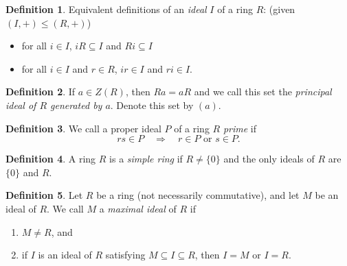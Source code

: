 \documentclass[12pt]{article}
\newcommand{\enumarabic}[1]{
	\begin{enumerate}[label=\textbf{\arabic*.}]
		#1
	\end{enumerate}
}
\theoremstyle{definition}
\newtheorem*{defn}{Definition}
\newcommand{\bulletize}[1]{%
	\begin{itemize}
		#1
	\end{itemize}
}
\begin{document}
\begin{defn}
	Equivalent definitions of an \emph{ideal} $I$ of a ring $R$: (given $(I,+)\leq (R,+)$)
	\bulletize{
		\item for all $i\in I$, $iR\subseteq I$ and $Ri\subseteq I$
		\item for all $i\in I$ and $r\in R$, $ir\in I$ and $ri\in I$.
	}
\end{defn}
\begin{defn}
	If $a\in Z(R)$, then $Ra=aR$ and we call this set the \emph{principal ideal of $R$ generated by $a$}.  Denote this set by $(a)$.
\end{defn}
\begin{defn}
	We call a proper ideal $P$ of a ring $R$ \emph{prime} if 
	\[rs\in P\quad\Rightarrow\quad r\in P\text{ or }s\in P.\]
\end{defn}
\begin{defn}
	A ring $R$ is a \emph{simple ring} if $R\neq\{0\}$ and the only ideals of $R$ are $\{0\}$ and $R$.
\end{defn}
\begin{defn}
	Let $R$ be a ring (not necessarily commutative), and let $M$ be an ideal of $R$.  We call $M$ a \emph{maximal ideal} of $R$ if
	\enumarabic{
		\item $M\neq R$, and
		\item if $I$ is an ideal of $R$ satisfying $M\subseteq I\subseteq R$, then $I=M$ or $I=R$.
	}
\end{defn}
\end{document}

